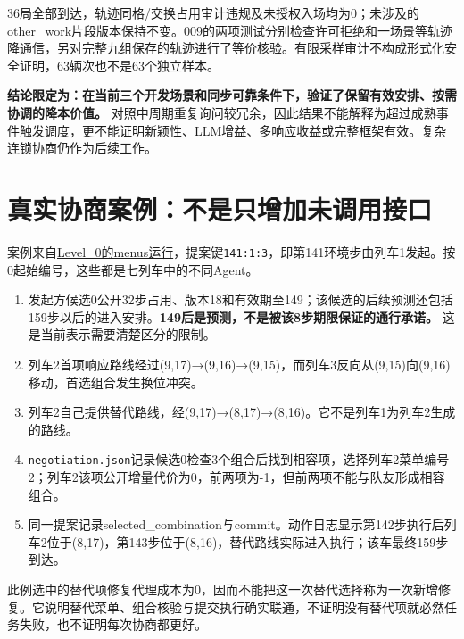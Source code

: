 36局全部到达，轨迹同格/交换占用审计违规及未授权入场均为0；未涉及的other\_work片段版本保持不变。009的两项测试分别检查许可拒绝和一场景等轨迹降通信，另对完整九组保存的轨迹进行了等价核验。有限采样审计不构成形式化安全证明，63辆次也不是63个独立样本。

\textbf{结论限定为：在当前三个开发场景和同步可靠条件下，验证了保留有效安排、按需协调的降本价值。}
对照中周期重复询问较冗余，因此结果不能解释为超过成熟事件触发调度，更不能证明新颖性、LLM增益、多响应收益或完整框架有效。复杂连锁协商仍作为后续工作。

\hypertarget{ux771fux5b9eux534fux5546ux6848ux4f8bux4e0dux662fux53eaux589eux52a0ux672aux8c03ux7528ux63a5ux53e3}{%
\chapter{真实协商案例：不是只增加未调用接口}\label{ux771fux5b9eux534fux5546ux6848ux4f8bux4e0dux662fux53eaux589eux52a0ux672aux8c03ux7528ux63a5ux53e3}}

案例来自\href{../expr/004-distributed-agent-core/runs/20261110-145737-343494-flatland-distributed/summary.json}{Level\_0的menus运行}，提案键\passthrough{\lstinline!141:1:3!}，即第141环境步由列车1发起。按0起始编号，这些都是七列车中的不同Agent。

\begin{enumerate}
\def\labelenumi{\arabic{enumi}.}
\tightlist
\item
  发起方候选0公开32步占用、版本18和有效期至149；该候选的后续预测还包括159步以后的进入安排。\textbf{149后是预测，不是被该8步期限保证的通行承诺。}
  这是当前表示需要清楚区分的限制。
\item
  列车2首项响应路线经过(9,17)→(9,16)→(9,15)，而列车3反向从(9,15)向(9,16)移动，首选组合发生换位冲突。
\item
  列车2自己提供替代路线，经(9,17)→(8,17)→(8,16)。它不是列车1为列车2生成的路线。
\item
  \passthrough{\lstinline!negotiation.json!}记录候选0检查3个组合后找到相容项，选择列车2菜单编号2；列车2该项公开增量代价为0，前两项为-1，但前两项不能与队友形成相容组合。
\item
  同一提案记录selected\_combination与commit。动作日志显示第142步执行后列车2位于(8,17)，第143步位于(8,16)，替代路线实际进入执行；该车最终159步到达。
\end{enumerate}

此例选中的替代项修复代理成本为0，因而不能把这一次替代选择称为一次新增修复。它说明替代菜单、组合核验与提交执行确实联通，不证明没有替代项就必然任务失败，也不证明每次协商都更好。

